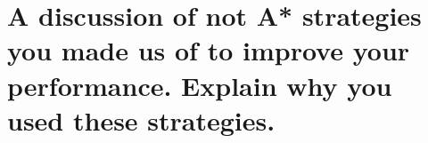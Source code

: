 \documentclass[12pt, a4paper]{article}
\begin{document}


\section{A discussion of not A* strategies you made us of to improve your performance. Explain why you used these strategies.}
\end{document}
